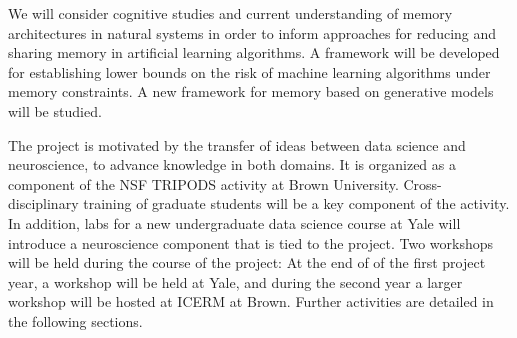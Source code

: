 We will consider cognitive studies and
current understanding of memory architectures in natural systems
in order to inform approaches for reducing and sharing memory in
artificial learning algorithms. A framework will be developed for
establishing lower bounds on the risk of machine learning algorithms under
memory constraints. A new framework for memory based on generative models
will be studied.

The project is motivated by the transfer of ideas between data science and neuroscience,
to advance knowledge in both domains. It is organized as a component
of the NSF TRIPODS activity at Brown University. Cross-disciplinary
training of graduate students will be a key component of the
activity. In addition, labs for a new undergraduate data science
course at Yale will introduce a neuroscience component that is tied to
the project. Two workshops will be held during the course of the
project: At the end of of the first project year, a workshop will be held at Yale, and 
during the second year a larger workshop will be hosted at ICERM at Brown. Further
activities are detailed in the following sections.
